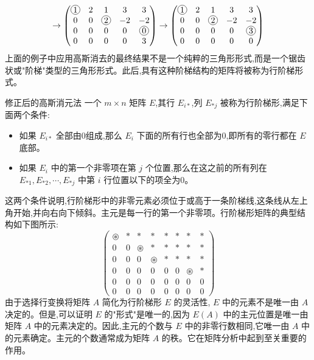 \documentclass[10pt, a4paper]{article}
\newcommand{\circlednum}[1]{%
    \tikz[baseline=(char.base)]{%
        \node[draw, circle, inner sep=1pt] (char) {#1};%
    }%
}
\begin{document}
\[
\to
\begin{pmatrix} 
\circlednum{1} & 2 & 1 & 3 & 3 \\ 
0 & 0 & \circlednum{2} & -2 & -2 \\ 
0 & 0 & 0 & 0 & \circlednum{0} \\ 
0 & 0 & 0 & 0 & 3 
\end{pmatrix}
\to
\begin{pmatrix} 
\circlednum{1} & 2 & 1 & 3 & 3 \\ 
0 & 0 & \circlednum{2} & -2 & -2 \\ 
0 & 0 & 0 & 0 & \circlednum{3} \\ 
0 & 0 & 0 & 0 & 0 
\end{pmatrix}
\]
上面的例子中应用高斯消去的最终结果不是一个纯粹的三角形形式,而是一个锯齿状或"阶梯"类型的三角形形式。此后,具有这种阶梯结构的矩阵将被称为行阶梯形式。

\begin{bluebox}{修正后的高斯消元法}
一个 \(m \times n\) 矩阵 \(E\),其行 \(E_{i *}\),列 \(E_{* j}\) 被称为行阶梯形,满足下面两个条件:
\begin{itemize}
    \item 如果 \(E_{i *}\) 全部由0组成,那么 \(E_{i}\) 下面的所有行也全部为0,即所有的零行都在 \(E\) 底部。
    \item 如果 \(E_{i}\) 中的第一个非零项在第 \(j\) 个位置,那么在这之前的所有列在 \(E_{* 1}, E_{* 2}, \cdots, E_{* j}\) 中第 \(i\) 行位置以下的项全为0。
\end{itemize}
\end{bluebox}

这两个条件说明,行阶梯形中的非零元素必须位于或高于一条阶梯线,这条线从左上角开始,并向右向下倾斜。主元是每一行的第一个非零项。行阶梯形矩阵的典型结构如下图所示:
\[
\begin{pmatrix} 
\circledast & * & * & * & * & * & * & * \\ 
0 & 0 & \circledast & * & * & * & * & * \\ 
0 & 0 & 0 & \circledast & * & * & * & * \\ 
0 & 0 & 0 & 0 & 0 & 0 & \circledast & * \\ 
0 & 0 & 0 & 0 & 0 & 0 & 0 & 0 \\ 
0 & 0 & 0 & 0 & 0 & 0 & 0 & 0 
\end{pmatrix}
\]
由于选择行变换将矩阵 \(A\) 简化为行阶梯形 \(E\) 的灵活性, \(E\) 中的元素不是唯一由 \(A\) 决定的。但是,可以证明 \(E\) 的"形式"是唯一的,因为 \(E(A)\) 中的主元位置是唯一由矩阵 \(A\) 中的元素决定的。因此,主元的个数与 \(E\) 中的非零行数相同,它唯一由 \(A\) 中的元素确定。主元的个数通常成为矩阵 \(A\) 的秩。它在矩阵分析中起到至关重要的作用。
\end{document}
